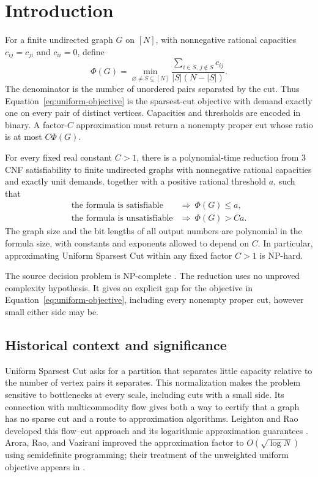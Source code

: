 \section{Introduction}\label{sec:introduction}

For a finite undirected graph $G$ on $[N]$, with nonnegative rational
capacities $c_{ij}=c_{ji}$ and $c_{ii}=0$, define
\begin{equation}\label{eq:uniform-objective}
 \Phi(G)=\min_{\varnothing\ne S\subsetneq[N]}
 \frac{\displaystyle\sum_{i\in S,\,j\notin S}c_{ij}}
 {|S|(N-|S|)}.
\end{equation}
The denominator is the number of unordered pairs separated by the cut.
Thus Equation~\eqref{eq:uniform-objective} is the sparsest-cut objective
with demand exactly one on every pair of distinct vertices.  Capacities
and thresholds are encoded in binary.  A factor-$C$ approximation must
return a nonempty proper cut whose ratio is at most $C\Phi(G)$.

\begin{theorem}\label{thm:main}
For every fixed real constant $C>1$, there is a polynomial-time reduction
from $3$CNF satisfiability to finite undirected graphs with nonnegative
rational capacities and exactly unit demands, together with a positive
rational threshold $a$, such that
\[
 \begin{array}{ll}
 \text{the formula is satisfiable}&\Longrightarrow\ \Phi(G)\le a,\\[2pt]
 \text{the formula is unsatisfiable}&\Longrightarrow\ \Phi(G)>Ca.
 \end{array}
\]
The graph size and the bit lengths of all output numbers are polynomial
in the formula size, with constants and exponents allowed to depend on
$C$.  In particular, approximating Uniform Sparsest Cut within any fixed
factor $C>1$ is NP-hard.
\end{theorem}

The source decision problem is NP-complete
\cite[Main Theorem, Problem~11]{Karp1972}.
The reduction uses no unproved complexity hypothesis.  It gives an
explicit gap for the objective in Equation~\eqref{eq:uniform-objective},
including every nonempty proper cut, however small either side may be.

\subsection{Historical context and significance}

Uniform Sparsest Cut asks for a partition that separates little capacity
relative to the number of vertex pairs it separates. This normalization
makes the problem sensitive to bottlenecks at every scale, including cuts
with a small side. Its connection with multicommodity flow gives both a
way to certify that a graph has no sparse cut and a route to approximation
algorithms. Leighton and Rao developed this flow--cut approach and its
logarithmic approximation guarantees \cite{LeightonRao1999}. Arora, Rao,
and Vazirani improved the approximation factor to $O(\sqrt{\log N})$
using semidefinite programming; their treatment of the unweighted uniform
objective appears in \cite[Section~6, Theorem~16]{ARV2009}.

